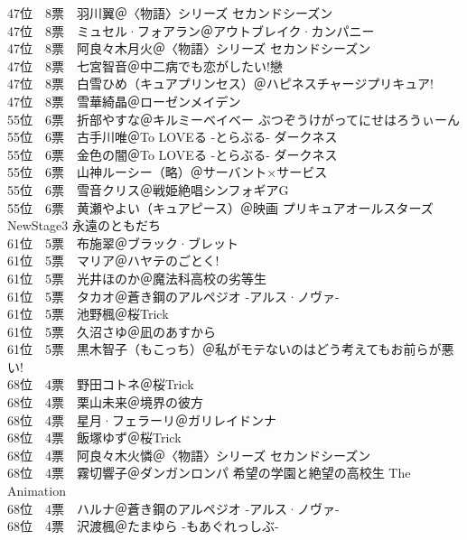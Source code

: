 {    47位　8票　羽川翼＠〈物語〉シリーズ セカンドシーズン\\
    47位　8票　ミュセル·フォアラン＠アウトブレイク·カンパニー\\
    47位　8票　阿良々木月火＠〈物語〉シリーズ セカンドシーズン\\
    47位　8票　七宮智音＠中二病でも恋がしたい!戀\\
    47位　8票　白雪ひめ（キュアプリンセス）＠ハピネスチャージプリキュア!\\
    47位　8票　雪華綺晶＠ローゼンメイデン\\
    55位　6票　折部やすな＠キルミーベイベー ぶつぞうけがってにせはろうぃーん\\
    55位　6票　古手川唯＠To LOVEる -とらぶる- ダークネス\\
    55位　6票　金色の闇＠To LOVEる -とらぶる- ダークネス\\
    55位　6票　山神ルーシー（略）＠サーバント×サービス\\
    55位　6票　雪音クリス＠戦姫絶唱シンフォギアG\\
    55位　6票　黄瀬やよい（キュアピース）＠映画 プリキュアオールスターズNewStage3 永遠のともだち\\
    61位　5票　布施翠＠ブラック·ブレット\\
    61位　5票　マリア＠ハヤテのごとく!\\
    61位　5票　光井ほのか＠魔法科高校の劣等生\\
    61位　5票　タカオ＠蒼き鋼のアルペジオ -アルス·ノヴァ-\\
    61位　5票　池野楓＠桜Trick\\
    61位　5票　久沼さゆ＠凪のあすから\\
    61位　5票　黒木智子（もこっち）＠私がモテないのはどう考えてもお前らが悪い!\\
    68位　4票　野田コトネ＠桜Trick\\
    68位　4票　栗山未来＠境界の彼方\\
    68位　4票　星月·フェラーリ＠ガリレイドンナ\\
    68位　4票　飯塚ゆず＠桜Trick\\
    68位　4票　阿良々木火憐＠〈物語〉シリーズ セカンドシーズン\\
    68位　4票　霧切響子＠ダンガンロンパ 希望の学園と絶望の高校生 The Animation\\
    68位　4票　ハルナ＠蒼き鋼のアルペジオ -アルス·ノヴァ-\\
    68位　4票　沢渡楓＠たまゆら -もあぐれっしぶ-\\
}

